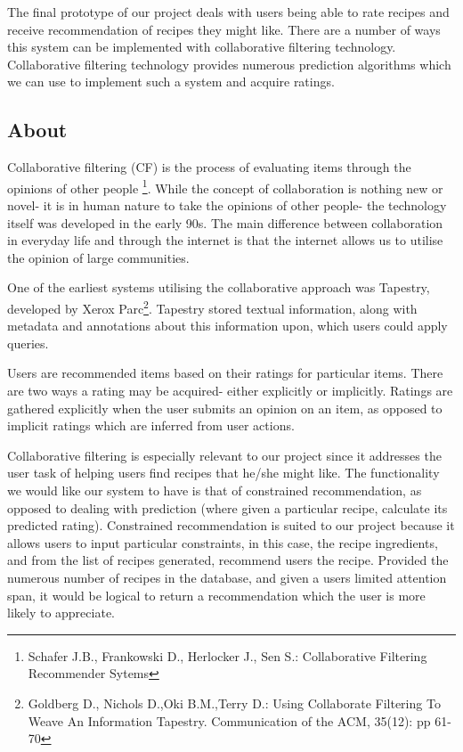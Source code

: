 The final prototype of our project deals with users being able to rate recipes and receive recommendation of recipes they might like. There are a number of ways this system can be implemented with collaborative filtering technology. Collaborative filtering technology provides numerous prediction algorithms which we can use to implement such a system and acquire ratings.

\subsection{About}

Collaborative filtering (CF) is the process of evaluating items through the opinions of other people \footnote{Schafer J.B., Frankowski D., Herlocker J., Sen S.: Collaborative Filtering Recommender Sytems}. While the concept of collaboration is nothing new or novel- it is in human nature to take the opinions of other people- the technology itself was developed in the early 90s. The main difference between collaboration in everyday life and through the internet is that the internet allows us to utilise the opinion of large communities. 

One of the earliest systems utilising the collaborative approach was Tapestry, developed by Xerox Parc\footnote{Goldberg D., Nichols D.,Oki B.M.,Terry D.: Using Collaborate Filtering To Weave An Information Tapestry. Communication of the ACM, 35(12): pp 61-70}. Tapestry stored textual information, along with metadata and annotations about this information upon, which users could apply queries.

Users are recommended items based on their ratings for particular items. There are two ways a rating may be acquired- either explicitly or implicitly. Ratings are gathered explicitly when the user submits an opinion on an item, as opposed to implicit ratings which are inferred from user actions.

Collaborative filtering is especially relevant to our project since it addresses the user task of helping users find recipes that he/she might like. The functionality we would like our system to have is that of constrained recommendation, as opposed to dealing with prediction (where given a particular recipe, calculate its predicted rating). Constrained recommendation is suited to our project because it allows users to input particular constraints, in this case, the recipe ingredients, and from the list of recipes generated, recommend users the recipe. Provided the numerous number of recipes in the database, and given a users limited attention span, it would be logical to return a recommendation which the user is more likely to appreciate.

